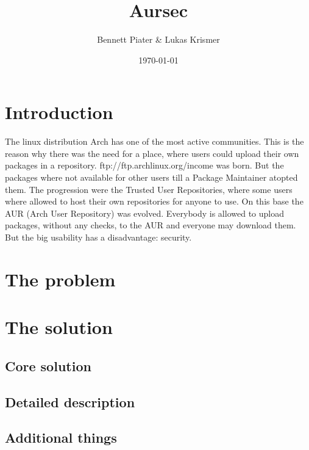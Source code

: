 \documentclass{scrartcl}
\title{Aursec}
\author{Bennett Piater \& Lukas Krismer}
\date{\today}
\begin{document}
  \thispagestyle{empty}

  
  
  \begin{abstract}
  \end{abstract}

  \tableofcontents
  \listoffigures
  \listoftables
  \pagebreak


  \section{Introduction}
  The linux distribution Arch has one of the most active communities. This is the reason why there was the need for a place, where users could upload their own packages in a repository. ftp://ftp.archlinux.org/income was born. But the packages where not available for other users till a Package Maintainer atopted them. The progression were the Trusted User Repositories, where some users where allowed to host their own repositories for anyone to use. On this base the AUR (Arch User Repository) was evolved. Everybody is allowed to upload packages, without any checks, to the AUR and everyone may download them. But the big usability has a disadvantage: security.  \cite{wiki:AUR}
  \section{The problem}
  \section{The solution}
    \subsection{Core solution}
    \subsection{Detailed description}
    \subsection{Additional things}
\end{document}
